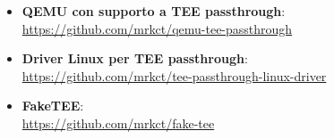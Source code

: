 \documentclass[12pt,italian]{report}
\begin{document}
\begin{itemize}
    \item 
        \textbf{QEMU con supporto a TEE passthrough}: \\
        \noindent 
        \url{https://github.com/mrkct/qemu-tee-passthrough}
    \item
        \textbf{Driver Linux per TEE passthrough}: \\ 
        \noindent
        \url{https://github.com/mrkct/tee-passthrough-linux-driver}
    \item
        \textbf{FakeTEE}: \\
        \noindent
        \url{https://github.com/mrkct/fake-tee}
\end{itemize}



\end{document}
